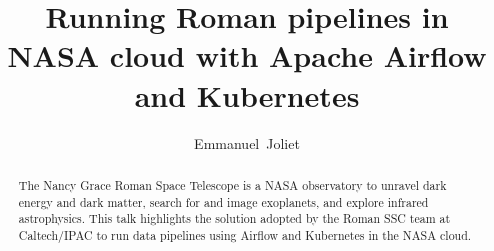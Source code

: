 \documentclass[11pt,twoside]{article}
\begin{document}
\title{Running Roman pipelines in NASA cloud with Apache Airflow and Kubernetes}

\author{Emmanuel~Joliet}




\begin{abstract}
The Nancy Grace Roman Space Telescope is a NASA observatory to unravel dark energy and dark matter, search for and image exoplanets, and explore infrared astrophysics. This talk highlights the solution adopted by the Roman SSC team at Caltech/IPAC to run data pipelines using Airflow and Kubernetes in the NASA cloud.
\end{abstract}

\end{document}
